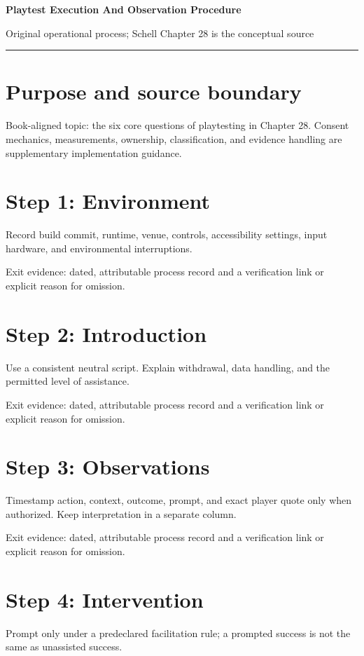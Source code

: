 \documentclass[11pt]{article}
\begin{document}
{\huge\bfseries\color{suiteblue} Playtest Execution And Observation Procedure}\par
\vspace{0.15in}
{\normalsize\color{suitegray} Original operational process; Schell Chapter 28 is the conceptual source}\par
\vspace{0.15in}\hrule\vspace{0.15in}

\section{Purpose and source boundary}
Book-aligned topic: the six core questions of playtesting in Chapter 28. Consent mechanics, measurements, ownership, classification, and evidence handling are supplementary implementation guidance.


\section{Step 1: Environment}
Record build commit, runtime, venue, controls, accessibility settings, input hardware, and environmental interruptions.

Exit evidence: dated, attributable process record and a verification link or explicit reason for omission.


\section{Step 2: Introduction}
Use a consistent neutral script. Explain withdrawal, data handling, and the permitted level of assistance.

Exit evidence: dated, attributable process record and a verification link or explicit reason for omission.


\section{Step 3: Observations}
Timestamp action, context, outcome, prompt, and exact player quote only when authorized. Keep interpretation in a separate column.

Exit evidence: dated, attributable process record and a verification link or explicit reason for omission.


\section{Step 4: Intervention}
Prompt only under a predeclared facilitation rule; a prompted success is not the same as unassisted success.
\end{document}
